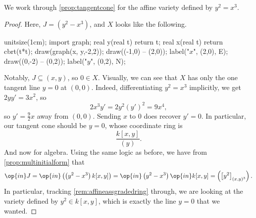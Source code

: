 

\begin{exe}
	We work through \autoref{prop:tangentcone} for the affine variety defined by $y^2=x^3$.
\end{exe}
\begin{proof}
	Here, $J=\left(y^2-x^3\right)$, and $X$ looks like the following.
	\begin{center}
		\begin{asy}
			unitsize(1cm);
			import graph;
			real y(real t)
			{
				return t;
			}
			real x(real t)
			{
				return cbrt(t*t);
			}
			draw(graph(x, y,-2,2));
			draw((-1,0) -- (2,0)); label("$x$", (2,0), E);
			draw((0,-2) -- (0,2)); label("$y$", (0,2), N);
		\end{asy}
	\end{center}
	Notably, $J\subseteq(x,y)$, so $0\in X$. Visually, we can see that $X$ has only the one tangent line $y=0$ at $(0,0)$. Indeed, differentiating $y^2=x^3$ implicitly, we get $2yy'=3x^2$, so
	\[2x^3y'=2y^2(y')^2=9x^4,\]
	so $y'=\frac92x$ away from $(0,0)$. Sending $x$ to $0$ does recover $y'=0$. In particular, our tangent cone should be $y=0$, whose coordinate ring is
	\[\frac{k[x,y]}{(y)}.\]
	And now for algebra. Using the same logic as before, we have from \autoref{prop:multinitialform} that
	\[\op{in}J=\op{in}\left(\left(y^2-x^3\right)k[x,y]\right)=\op{in}\left(y^2-x^3\right)\op{in}k[x,y]=\left(\left[y^2\right]_{(x,y)^3}\right).\]
	In particular, tracking \autoref{rem:affineassgradedring} through, we are looking at the variety defined by $y^2\in k[x,y]$, which is exactly the line $y=0$ that we wanted.
\end{proof}

